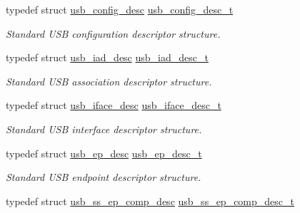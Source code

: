 \begin{DoxyCompactItemize}
\mbox{\label{group__usb__protocol__group_gaeaef4c20199a912d1b2353c0b709b753}} 
typedef struct \hyperlink{structusb__config__desc}{usb\+\_\+config\+\_\+desc} \hyperlink{group__usb__protocol__group_gaeaef4c20199a912d1b2353c0b709b753}{usb\+\_\+config\+\_\+desc\+\_\+t}
\begin{DoxyCompactList}\small\item\em Standard U\+SB configuration descriptor structure. \end{DoxyCompactList}\item 
\mbox{\label{group__usb__protocol__group_ga514f22c5dce37c5141b13ad75ad7111b}} 
typedef struct \hyperlink{structusb__iad__desc}{usb\+\_\+iad\+\_\+desc} \hyperlink{group__usb__protocol__group_ga514f22c5dce37c5141b13ad75ad7111b}{usb\+\_\+iad\+\_\+desc\+\_\+t}
\begin{DoxyCompactList}\small\item\em Standard U\+SB association descriptor structure. \end{DoxyCompactList}\item 
\mbox{\label{group__usb__protocol__group_ga0f4aed9bd3c4887ce2590675f9db9fc8}} 
typedef struct \hyperlink{structusb__iface__desc}{usb\+\_\+iface\+\_\+desc} \hyperlink{group__usb__protocol__group_ga0f4aed9bd3c4887ce2590675f9db9fc8}{usb\+\_\+iface\+\_\+desc\+\_\+t}
\begin{DoxyCompactList}\small\item\em Standard U\+SB interface descriptor structure. \end{DoxyCompactList}\item 
\mbox{\label{group__usb__protocol__group_ga716572dc6c2f9ddbd217944712406fc9}} 
typedef struct \hyperlink{structusb__ep__desc}{usb\+\_\+ep\+\_\+desc} \hyperlink{group__usb__protocol__group_ga716572dc6c2f9ddbd217944712406fc9}{usb\+\_\+ep\+\_\+desc\+\_\+t}
\begin{DoxyCompactList}\small\item\em Standard U\+SB endpoint descriptor structure. \end{DoxyCompactList}\item 
\mbox{\label{group__usb__protocol__group_ga4b949e0003de09a97cdcddc241c9c108}} 
typedef struct \hyperlink{structusb__ss__ep__comp__desc}{usb\+\_\+ss\+\_\+ep\+\_\+comp\+\_\+desc} \hyperlink{group__usb__protocol__group_ga4b949e0003de09a97cdcddc241c9c108}{usb\+\_\+ss\+\_\+ep\+\_\+comp\+\_\+desc\+\_\+t}

\end{DoxyCompactItemize}
